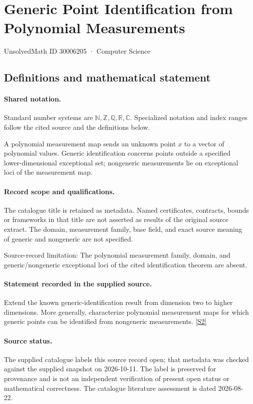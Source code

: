 \documentclass[11pt]{article}
\newcommand{\sref}[2]{\hyperlink{source:#1:#2}{[S#2]}}
\begin{document}
\setcounter{section}{30006204}
\section{Generic Point Identification from Polynomial Measurements}\label{30006205}
{\small\sffamily UnsolvedMath ID 30006205 · Computer Science}
\subsection{Definitions and mathematical statement}

\paragraph{Shared notation.}Standard number systems are $\mathbb N,\mathbb Z,\mathbb Q,\mathbb R,\mathbb C$. Specialized notation and index ranges follow the cited source and the definitions below.


A polynomial measurement map sends an unknown point $x$ to a vector of polynomial values. Generic identification concerns points outside a specified lower-dimensional exceptional set; nongeneric measurements lie on exceptional loci of the measurement map.
\paragraph{Record scope and qualifications.}
The catalogue title is retained as metadata. Named certificates, contracts, bounds or frameworks in that title are not asserted as results of the original source extract.
The domain, measurement family, base field, and exact source meaning of generic and nongeneric are not specified.

Source-record limitation: The polynomial measurement family, domain, and generic/nongeneric exceptional loci of the cited identification theorem are absent.
\paragraph{Statement recorded in the supplied source.}
Extend the known generic-identification result from dimension two to higher dimensions. More generally, characterize polynomial measurement maps for which generic points can be identified from nongeneric measurements. \sref{30006205}{2}
\paragraph{Source status.}
The supplied catalogue labels this source record open; that metadata was checked against the supplied snapshot on 2026-10-11. The label is preserved for provenance and is not an independent verification of present open status or mathematical correctness. The catalogue literature assessment is dated 2026-08-22.
\end{document}

